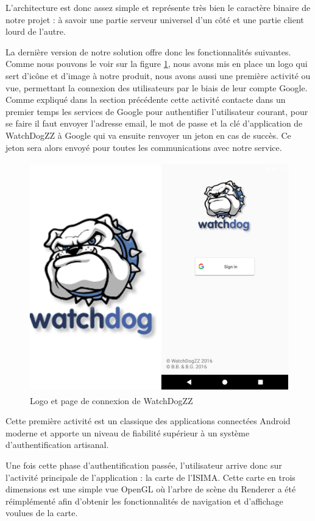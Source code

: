 L’architecture est donc assez simple et représente très bien le caractère binaire de notre projet : à savoir une partie serveur universel d’un côté et une partie client lourd de l’autre.

La dernière version de notre solution offre donc les fonctionnalités suivantes. Comme nous pouvons le voir sur la figure \ref{screen1}, nous avons mis en place un logo qui sert d’icône et d’image à notre produit, nous avons aussi une première activité ou vue, permettant la connexion des utilisateurs par le biais de leur compte Google. Comme expliqué dans la section précédente cette activité contacte dans un premier temps les services de Google pour authentifier l’utilisateur courant, pour se faire il faut envoyer l’adresse email, le mot de passe et la clé d’application de WatchDogZZ à Google qui va ensuite renvoyer un jeton en cas de succès. Ce jeton sera alors envoyé pour toutes les communications avec notre service.

\begin{figure}[H]
    \centering
    \includegraphics[height=10cm]{./img/screen1.png}
    \caption{Logo et page de connexion de WatchDogZZ}
    \label{screen1}
\end{figure}

Cette première activité est un classique des applications connectées Android moderne et apporte un niveau de fiabilité supérieur à un système d’authentification artisanal.

Une fois cette phase d’authentification passée, l’utilisateur arrive donc sur l’activité principale de l’application : la carte de l’ISIMA. Cette carte en trois dimensions est une simple vue OpenGL où l’arbre de scène du Renderer a été réimplémenté afin d’obtenir les fonctionnalités de navigation et d’affichage voulues de la carte.

